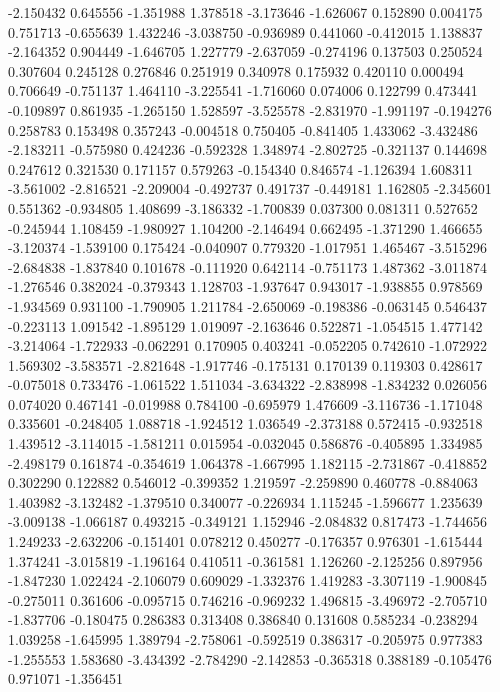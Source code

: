 -2.150432
0.645556
-1.351988
1.378518
-3.173646
-1.626067
0.152890
0.004175
0.751713
-0.655639
1.432246
-3.038750
-0.936989
0.441060
-0.412015
1.138837
-2.164352
0.904449
-1.646705
1.227779
-2.637059
-0.274196
0.137503
0.250524
0.307604
0.245128
0.276846
0.251919
0.340978
0.175932
0.420110
0.000494
0.706649
-0.751137
1.464110
-3.225541
-1.716060
0.074006
0.122799
0.473441
-0.109897
0.861935
-1.265150
1.528597
-3.525578
-2.831970
-1.991197
-0.194276
0.258783
0.153498
0.357243
-0.004518
0.750405
-0.841405
1.433062
-3.432486
-2.183211
-0.575980
0.424236
-0.592328
1.348974
-2.802725
-0.321137
0.144698
0.247612
0.321530
0.171157
0.579263
-0.154340
0.846574
-1.126394
1.608311
-3.561002
-2.816521
-2.209004
-0.492737
0.491737
-0.449181
1.162805
-2.345601
0.551362
-0.934805
1.408699
-3.186332
-1.700839
0.037300
0.081311
0.527652
-0.245944
1.108459
-1.980927
1.104200
-2.146494
0.662495
-1.371290
1.466655
-3.120374
-1.539100
0.175424
-0.040907
0.779320
-1.017951
1.465467
-3.515296
-2.684838
-1.837840
0.101678
-0.111920
0.642114
-0.751173
1.487362
-3.011874
-1.276546
0.382024
-0.379343
1.128703
-1.937647
0.943017
-1.938855
0.978569
-1.934569
0.931100
-1.790905
1.211784
-2.650069
-0.198386
-0.063145
0.546437
-0.223113
1.091542
-1.895129
1.019097
-2.163646
0.522871
-1.054515
1.477142
-3.214064
-1.722933
-0.062291
0.170905
0.403241
-0.052205
0.742610
-1.072922
1.569302
-3.583571
-2.821648
-1.917746
-0.175131
0.170139
0.119303
0.428617
-0.075018
0.733476
-1.061522
1.511034
-3.634322
-2.838998
-1.834232
0.026056
0.074020
0.467141
-0.019988
0.784100
-0.695979
1.476609
-3.116736
-1.171048
0.335601
-0.248405
1.088718
-1.924512
1.036549
-2.373188
0.572415
-0.932518
1.439512
-3.114015
-1.581211
0.015954
-0.032045
0.586876
-0.405895
1.334985
-2.498179
0.161874
-0.354619
1.064378
-1.667995
1.182115
-2.731867
-0.418852
0.302290
0.122882
0.546012
-0.399352
1.219597
-2.259890
0.460778
-0.884063
1.403982
-3.132482
-1.379510
0.340077
-0.226934
1.115245
-1.596677
1.235639
-3.009138
-1.066187
0.493215
-0.349121
1.152946
-2.084832
0.817473
-1.744656
1.249233
-2.632206
-0.151401
0.078212
0.450277
-0.176357
0.976301
-1.615444
1.374241
-3.015819
-1.196164
0.410511
-0.361581
1.126260
-2.125256
0.897956
-1.847230
1.022424
-2.106079
0.609029
-1.332376
1.419283
-3.307119
-1.900845
-0.275011
0.361606
-0.095715
0.746216
-0.969232
1.496815
-3.496972
-2.705710
-1.837706
-0.180475
0.286383
0.313408
0.386840
0.131608
0.585234
-0.238294
1.039258
-1.645995
1.389794
-2.758061
-0.592519
0.386317
-0.205975
0.977383
-1.255553
1.583680
-3.434392
-2.784290
-2.142853
-0.365318
0.388189
-0.105476
0.971071
-1.356451
